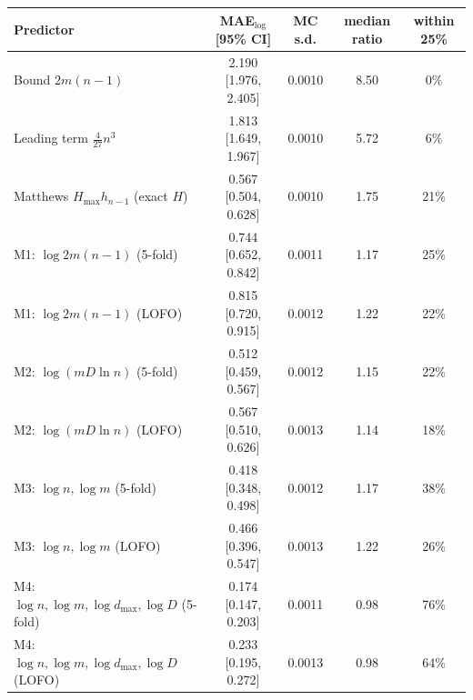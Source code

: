 \begin{tabular}{lcccc}
\toprule
Predictor & MAE$_{\log}$ [95\% CI] & MC s.d. & median ratio & within 25\% \\
\midrule
Bound $2m(n-1)$ & 2.190 [1.976, 2.405] & 0.0010 & 8.50 & 0\% \\
Leading term $\frac{4}{27}n^3$ & 1.813 [1.649, 1.967] & 0.0010 & 5.72 & 6\% \\
Matthews $H_{\max} h_{n-1}$ (exact $H$) & 0.567 [0.504, 0.628] & 0.0010 & 1.75 & 21\% \\
M1: $\log 2m(n{-}1)$ (5-fold) & 0.744 [0.652, 0.842] & 0.0011 & 1.17 & 25\% \\
M1: $\log 2m(n{-}1)$ (LOFO) & 0.815 [0.720, 0.915] & 0.0012 & 1.22 & 22\% \\
M2: $\log(mD\ln n)$ (5-fold) & 0.512 [0.459, 0.567] & 0.0012 & 1.15 & 22\% \\
M2: $\log(mD\ln n)$ (LOFO) & 0.567 [0.510, 0.626] & 0.0013 & 1.14 & 18\% \\
M3: $\log n,\log m$ (5-fold) & 0.418 [0.348, 0.498] & 0.0012 & 1.17 & 38\% \\
M3: $\log n,\log m$ (LOFO) & 0.466 [0.396, 0.547] & 0.0013 & 1.22 & 26\% \\
M4: $\log n,\log m,\log d_{\max},\log D$ (5-fold) & 0.174 [0.147, 0.203] & 0.0011 & 0.98 & 76\% \\
M4: $\log n,\log m,\log d_{\max},\log D$ (LOFO) & 0.233 [0.195, 0.272] & 0.0013 & 0.98 & 64\% \\
\bottomrule
\end{tabular}